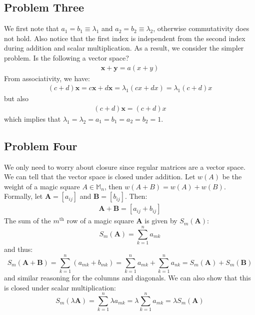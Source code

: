 \documentclass{article}
\begin{document}
\subsection*{Problem Three}
We first note that $a_1=b_1 \equiv \lambda_1$ and $a_2=b_2 \equiv \lambda_2$, otherwise commutativity  does not hold. Also notice that the first index is independent from the second index during addition and scalar multiplication. As a result, we consider the simpler problem. Is the following a vector space?
\begin{align}
    \bm{x} + \bm{y} = a(x+y)
\end{align}
From associativity, we have:
\begin{align}
    (c+d)\bm{x} = c\bm{x}+d\bm{x} = \lambda_1(cx+dx) = \lambda_1(c+d)x
\end{align}
but also
\begin{align}
    (c+d)\bm{x} = (c+d)x
\end{align}
which implies that $\lambda_1=\lambda_2 = a_1=b_1=a_2=b_2=1$.
\subsection*{Problem Four}
We only need to worry about closure since regular matrices are a vector space. We can tell that the vector space is closed under addition. Let $w(A)$ be the weight of a magic square $A \in \mathbb{M}_n$, then $w(A+B)=w(A)+w(B)$. Formally, let $\bm{A} = [a_{ij}]$ and $\bm{B} = [b_{ij}]$. Then:
\begin{align}
    \bm{A} + \bm{B} = [a_{ij}+b_{ij}]
\end{align}
The sum of the $m^\text{th}$ row of a magic square $\bm{A}$ is given by $S_m(\bm{A})$:
\begin{equation}
    S_m(\bm{A}) = \sum_{k=1}^n a_{mk}
\end{equation}
and thus:
\begin{equation}
    S_m(\bm{A}+\bm{B}) = \sum_{k=1}^n (a_{mk}+b_{mk}) = \sum_{k=1}^n a_{mk} + \sum_{k=1}^n a_{nk} = S_m(\bm{A}) + S_m(\bm{B})
\end{equation}
and similar reasoning for the columns and diagonals. We can also show that this is closed under scalar multiplication:
\begin{equation}
    S_m(\lambda \bm{A} ) =\sum_{k=1}^n \lambda a_{mk} = \lambda \sum_{k=1}^n a_{mk} = \lambda S_m(\bm{A})
\end{equation}
\vspace{2mm}
\end{document}
